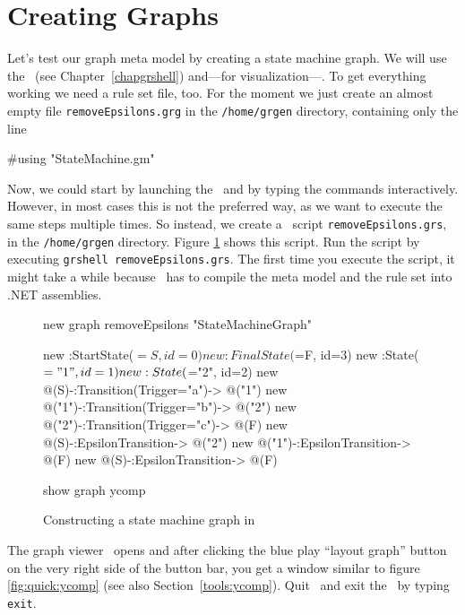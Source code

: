 \section{Creating Graphs}
\label{sct:quick:create}

Let's test our graph meta model by creating a state machine graph.
We will use the \GrShell\ (see Chapter~\ref{chapgrshell}) and---for visualization---\yComp.
To get everything working we need a rule set file, too.
For the moment we just create an almost empty file \texttt{removeEpsilons.grg} in the \texttt{/home/grgen} directory, containing only the line
\begin{grgen}
#using "StateMachine.gm"
\end{grgen}
Now, we could start by launching the \GrShell\ and by typing the commands interactively.
However, in most cases this is not the preferred way, as we want to execute the same steps multiple times.
So instead, we create a \GrShell\ script \texttt{removeEpsilons.grs}, in the \texttt{/home/grgen} directory.
Figure \ref{fig:quick:shell} shows this script.
Run the script by executing \texttt{grshell removeEpsilons.grs}.
The first time you execute the script, it might take a while because \GrG\ has to compile the meta model and the rule set into .NET assemblies.

\begin{figure}[htbp]
    \centering
    \begin{grgen}
new graph removeEpsilons "StateMachineGraph"

new :StartState($=S, id=0)
new :FinalState($=F, id=3)
new :State($="1", id=1)
new :State($="2", id=2)
new @(S)-:Transition(Trigger="a")-> @("1")
new @("1")-:Transition(Trigger="b")-> @("2")
new @("2")-:Transition(Trigger="c")-> @(F)
new @(S)-:EpsilonTransition-> @("2")
new @("1")-:EpsilonTransition-> @(F)
new @(S)-:EpsilonTransition-> @(F)

show graph ycomp
    \end{grgen}
    \caption{Constructing a state machine graph in \GrShell}
    \label{fig:quick:shell}
\end{figure}

The graph viewer \yComp\ opens and after clicking the blue play ``layout graph'' button on the very right side of the button bar, you get a window similar to figure \ref{fig:quick:ycomp} (see also Section~\ref{tools:ycomp}).
Quit \yComp\ and exit the \GrShell\ by typing \texttt{exit}.

